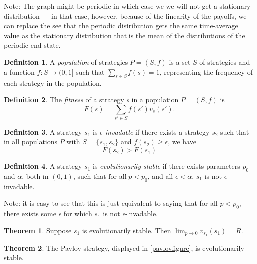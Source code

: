 \documentclass[11pt]{amsart}
\theoremstyle{definition}
\newtheorem{definition}{Definition}
\newtheorem{theorem}{Theorem}
\theoremstyle{remark}
\begin{document}
Note: The graph might be periodic in which case we we will not get a stationary distribution — in that case, however, because of the linearity of the payoffs, we can replace the see that the periodic distribution gets the same time-average value as the stationary distribution that is the mean of the distributions of the periodic end state.

\begin{definition}
  A \textit{population} of strategies $P = (S, f)$ is a set $S$ of strategies and a function $f : S \to (0,1]$ such that $\sum_{s \in S} f(s) = 1$, representing the frequency of each strategy in the population.
\end{definition}

\begin{definition}
  The \textit{fitness} of a strategy $s$ in a population $P = (S, f)$ is \begin{equation*}
    F(s) = \sum_{s' \in S} f(s') v_s(s').
  \end{equation*}
\end{definition}

\begin{definition}
  A strategy $s_1$ is \textit{$\epsilon$-invadable} if there exists a strategy $s_2$ such that in all populations $P$ with $S = \{s_1,s_2\}$ and $f(s_2) \geq \epsilon$, we have \begin{equation}
    \label{fitnesscond}
    F(s_2) > F(s_1)
  \end{equation}
\end{definition}

\begin{definition}
  A strategy $s_1$ is \textit{evolutionarily stable} if there exists parameters $p_0$ and $\alpha$, both in $(0,1)$, such that for all $p < p_0$, and all $\epsilon < \alpha$, $s_1$ is not $\epsilon$-invadable.
\end{definition}

Note: it is easy to see that this is just equivalent to saying that for all $p < p_0$, there exists some $\epsilon$ for which $s_1$ is not $\epsilon$-invadable.

\begin{theorem}
  \label{evolutionarystable1}
  Suppose $s_1$ is evolutionarily stable. Then $\lim_{p \to 0} v_{s_1}(s_1) = R$.
\end{theorem}

\begin{theorem}
  \label{pavlovtheorem}
  The Pavlov strategy, displayed in \cref{pavlovfigure}, is evolutionarily stable.
\end{theorem}
\end{document}
